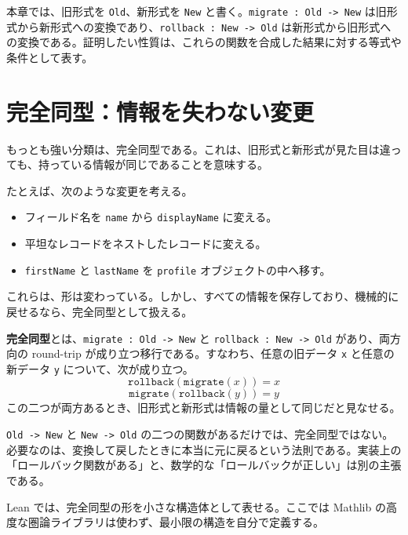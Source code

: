 \begin{definitionbox}
本章では、旧形式を \texttt{Old}、新形式を \texttt{New} と書く。\texttt{migrate : Old -> New} は旧形式から新形式への変換であり、\texttt{rollback : New -> Old} は新形式から旧形式への変換である。証明したい性質は、これらの関数を合成した結果に対する等式や条件として表す。
\end{definitionbox}

\section{完全同型：情報を失わない変更}

もっとも強い分類は、完全同型である。これは、旧形式と新形式が見た目は違っても、持っている情報が同じであることを意味する。

たとえば、次のような変更を考える。

\begin{itemize}
\item フィールド名を \texttt{name} から \texttt{displayName} に変える。
\item 平坦なレコードをネストしたレコードに変える。
\item \texttt{firstName} と \texttt{lastName} を \texttt{profile} オブジェクトの中へ移す。
\end{itemize}

これらは、形は変わっている。しかし、すべての情報を保存しており、機械的に戻せるなら、完全同型として扱える。

\begin{definitionbox}
\textbf{完全同型}とは、\texttt{migrate : Old -> New} と \texttt{rollback : New -> Old} があり、両方向の round-trip が成り立つ移行である。すなわち、任意の旧データ \texttt{x} と任意の新データ \texttt{y} について、次が成り立つ。
\[
\texttt{rollback}(\texttt{migrate}(x)) = x
\]
\[
\texttt{migrate}(\texttt{rollback}(y)) = y
\]
この二つが両方あるとき、旧形式と新形式は情報の量として同じだと見なせる。
\end{definitionbox}

\begin{warningbox}
\texttt{Old -> New} と \texttt{New -> Old} の二つの関数があるだけでは、完全同型ではない。必要なのは、変換して戻したときに本当に元に戻るという法則である。実装上の「ロールバック関数がある」と、数学的な「ロールバックが正しい」は別の主張である。
\end{warningbox}

Lean では、完全同型の形を小さな構造体として表せる。ここでは Mathlib の高度な圏論ライブラリは使わず、最小限の構造を自分で定義する。

